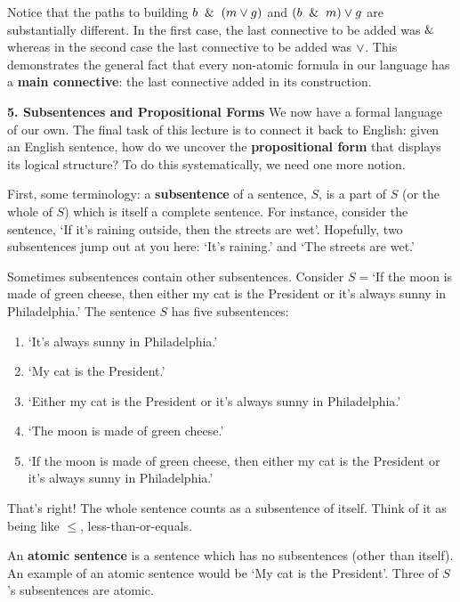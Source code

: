 \documentclass[options]{philosophersimprint}
\theoremstyle{definition}
\begin{document}
Notice that the paths to building $b \ \mathbin{\&} \  (m\mathbin{\vee} g)$ and $(b \ \mathbin{\&} \  m)\mathbin{\vee} g$ are substantially different. In the first case, the last connective to be added was $\mathbin{\&}$ whereas in the second case the last connective to be added was $\mathbin{\vee}$.  This demonstrates the general fact that every non-atomic formula in our language has a \textbf{main connective}: the last connective added in its construction.


\textbf{5. Subsentences and Propositional Forms} We now have a formal language of our own. The final task of this lecture is to connect it back to English: given an English sentence, how do we uncover the \textbf{propositional form} that displays its logical structure? To do this systematically, we need one more notion.

First, some terminology: a \textbf{subsentence} of a sentence, $S$, is a part of $S$ (or the whole of $S$) which is itself a complete sentence. For instance, consider the sentence, `If it's raining outside, then the streets are wet'. Hopefully, two subsentences jump out at you here: `It's raining.' and `The streets are wet.'

Sometimes subsentences contain other subsentences. Consider $S =$`If the moon is made of green cheese, then either my cat is the President or it's always sunny in Philadelphia.' The sentence $S$ has five subsentences:
\begin{enumerate}
    \item `It's always sunny in Philadelphia.'
    \item `My cat is the President.'
    \item `Either my cat is the President or it's always sunny in Philadelphia.'
    \item `The moon is made of green cheese.'
    \item `If the moon is made of green cheese, then either my cat is the President or it's always sunny in Philadelphia.'
\end{enumerate}
That's right! The whole sentence counts as a subsentence of itself. Think of it as being like $\leq$, less-than-or-equals.

An \textbf{atomic sentence} is a sentence which has no subsentences (other than itself). An example of an atomic sentence would be `My cat is the President'. Three of $S$'s subsentences are atomic.
\end{document}
